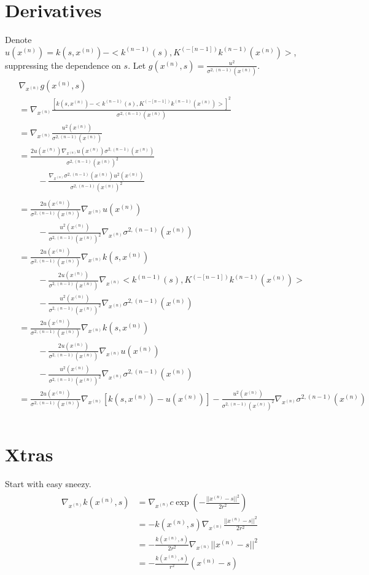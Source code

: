 \documentclass[paper=a4, fontsize=11pt]{scrartcl} %
\numberwithin{equation}{section} %
\numberwithin{figure}{section} %
\numberwithin{table}{section} %
\newcommand{\bars}{ \ \ \ \ \ \ \ \ \ \ }
\newcommand{\gxn}{\nabla_{x^{(n)}}} %
\newcommand{\xn}{x^{(n)}} %
\newcommand{\knm}{k^{(n-1)}}
\newcommand{\Kinvnm}{K^{(-[n-1])}}
\newcommand{\sqnm}{\sigma ^{2 , (n-1)}     }
\begin{document}
\section{Derivatives}
Denote $u(\xn) = k(s, \xn)  - < \knm (s) ,  \Kinvnm \knm (\xn) > $, suppressing 
the dependence on $s$. 
Let  $g(\xn,s) = \frac{u^2}{\sqnm(\xn)}$.
\begin{align}
 \begin{split}
%
%
%
&\gxn g(\xn,s) \\
%
%
%
%
&=\gxn \frac{[k(s, \xn)  - < \knm (s) ,  \Kinvnm \knm (\xn) > ]^2}{\sqnm(\xn)}\\
%
%
%
%
&= \gxn \frac{ u^2 (\xn) }{\sqnm(\xn)}\\
%
%
%
&=\frac{ 2u(\xn)\gxn u(\xn) \sqnm(\xn)}{\sqnm(\xn)^2} \\
	    &\bars- \frac{\gxn \sqnm(\xn) u^2(\xn)}{\sqnm(\xn)^2} \\\\
%
%
%
&=\frac{ 2u(\xn)}{\sqnm(\xn)} \gxn u(\xn)\\
	    &\bars- \frac{u^2(\xn)}{\sqnm(\xn)^2}\gxn \sqnm(\xn) \\
%
%
%
%
&=\frac{ 2u(\xn)}{\sqnm(\xn)} \gxn k(s , \xn) \\
	    &\bars - \frac{ 2u(\xn)}{\sqnm(\xn)} \gxn< \knm (s) ,  \Kinvnm \knm (\xn) > \\
	    &\bars - \frac{u^2(\xn)}{\sqnm(\xn)^2}\gxn \sqnm(\xn) \\
%
%
%
%
&=\frac{ 2u(\xn)}{\sqnm(\xn)} \gxn k(s , \xn) \\
	    &\bars - \frac{ 2u(\xn)}{\sqnm(\xn)} \gxn u(\xn) \\
	    &\bars - \frac{u^2(\xn)}{\sqnm(\xn)^2}\gxn \sqnm(\xn) \\
%
%
%
%
%
%
&=\frac{ 2u(\xn)}{\sqnm(\xn)} \gxn [k(s , \xn) - u(\xn)] - \frac{u^2(\xn)}{\sqnm(\xn)^2}\gxn \sqnm(\xn) \\
%
%
%
%
%
%
\end{split}
\end{align}


\section{Xtras}
Start with easy sneezy.
\begin{align}
 \begin{split}
  \gxn k(\xn,s) &= \gxn c\exp(-\frac{||\xn - s||^2}{2r^2} )\\
%
&= -k(\xn,s) \gxn\frac{||\xn - s||^2}{2r^2} \\
%
&= -\frac{k(\xn,s)}{2r^2} \gxn||\xn - s||^2 \\
%
&= -\frac{k(\xn ,s)}{r^2} (\xn-s)\\
 \end{split}
\end{align}
\end{document}
